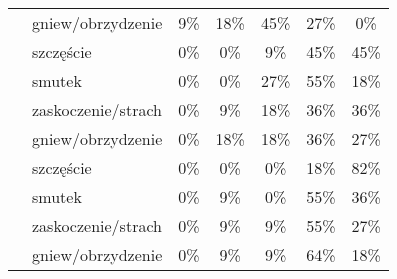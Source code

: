 \begin{table}
\begin{tabular}{|c|l|c|c|c|c|c|}
\cline{2-7}
                                 & gniew/obrzydzenie                                     & 9\%        & 18\%       & \textcolor[rgb]{0,0.588,0}{45\%} & 27\%                               & 0\%                                 \\ 
\hhline{|=======|}
\multirow{4}{*}{trzeci}          & szczęście                                             & 0\%        & 0\%        & 9\%                              & \textcolor[rgb]{0,0.588,0}{45\%}   & \textcolor[rgb]{0,0.588,0}{45\%}    \\ 
\cline{2-7}
                                 & smutek                                                & 0\%        & 0\%        & 27\%                             & \textcolor[rgb]{0,0.588,0}{55\%}   & 18\%                                \\ 
\cline{2-7}
                                 & zaskoczenie/strach                                    & 0\%        & 9\%        & 18\%                             & \textcolor[rgb]{0,0.588,0}{36\%}   & \textcolor[rgb]{0,0.588,0}{36\%}    \\ 
\cline{2-7}
                                 & gniew/obrzydzenie                                     & 0\%        & 18\%       & 18\%                             & \textcolor[rgb]{0,0.588,0}{36\%}   & 27\%                                \\ 
\hhline{|=======|}
\multirow{4}{*}{czwarty}         & szczęście                                             & 0\%        & 0\%        & 0\%                              & 18\%                               & \textcolor[rgb]{0,0.588,0}{82\%}    \\ 
\cline{2-7}
                                 & smutek                                                & 0\%        & 9\%        & 0\%                              & \textcolor[rgb]{0,0.588,0}{55\%}   & 36\%                                \\ 
\cline{2-7}
                                 & zaskoczenie/strach                                    & 0\%        & 9\%        & 9\%                              & \textcolor[rgb]{0,0.588,0}{55\%}   & 27\%                                \\ 
\cline{2-7}
                                 & gniew/obrzydzenie                                     & 0\%        & 9\%        & 9\%                              & \textcolor[rgb]{0,0.588,0}{64\%}   & 18\%                                \\
\hline
\end{tabular}
\end{table}




